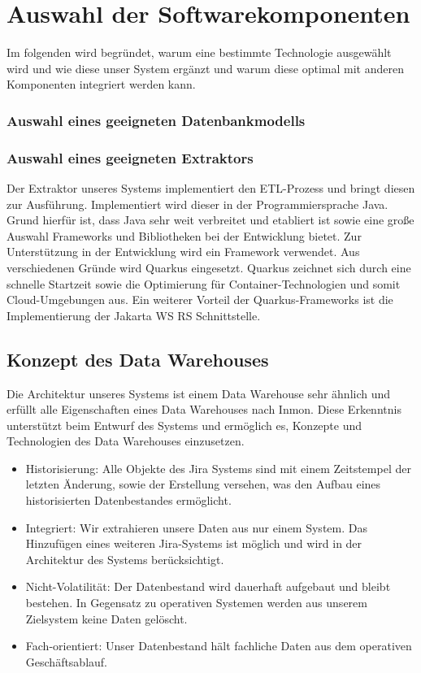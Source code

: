 \documentclass[10pt]{article}
\begin{document}
\section{Auswahl der Softwarekomponenten}
Im folgenden wird begründet, warum eine bestimmte Technologie ausgewählt wird und wie diese unser System ergänzt und warum diese optimal mit anderen Komponenten integriert werden kann.
\subsubsection{Auswahl eines geeigneten Datenbankmodells}
\subsubsection{Auswahl eines geeigneten Extraktors}
Der Extraktor unseres Systems implementiert den ETL-Prozess und bringt diesen zur Ausführung. Implementiert wird dieser in der Programmiersprache Java. Grund hierfür ist, dass Java sehr weit verbreitet und etabliert ist sowie eine große Auswahl Frameworks und Bibliotheken bei der Entwicklung bietet. Zur Unterstützung in der Entwicklung wird ein Framework verwendet. Aus verschiedenen Gründe wird Quarkus eingesetzt. Quarkus zeichnet sich durch eine schnelle Startzeit sowie die Optimierung für Container-Technologien und somit Cloud-Umgebungen aus. Ein weiterer Vorteil der Quarkus-Frameworks ist die Implementierung der Jakarta WS RS Schnittstelle.
\subsection{Konzept des Data Warehouses}
Die Architektur unseres Systems ist einem Data Warehouse sehr ähnlich und erfüllt alle Eigenschaften eines Data Warehouses nach Inmon. Diese Erkenntnis unterstützt beim Entwurf des Systems und ermöglich es, Konzepte und Technologien des Data Warehouses einzusetzen.
\begin{itemize}
  \item Historisierung: Alle Objekte des Jira Systems sind mit einem Zeitstempel der letzten Änderung, sowie der Erstellung versehen, was den Aufbau eines historisierten Datenbestandes ermöglicht.
  \item Integriert: Wir extrahieren unsere Daten aus nur einem System. Das Hinzufügen eines weiteren Jira-Systems ist möglich und wird in der Architektur des Systems berücksichtigt.
  \item Nicht-Volatilität: Der Datenbestand wird dauerhaft aufgebaut und bleibt bestehen. In Gegensatz zu operativen Systemen werden aus unserem Zielsystem keine Daten gelöscht.
  \item Fach-orientiert: Unser Datenbestand hält fachliche Daten aus dem operativen Geschäftsablauf.
\end{itemize}
\end{document}
